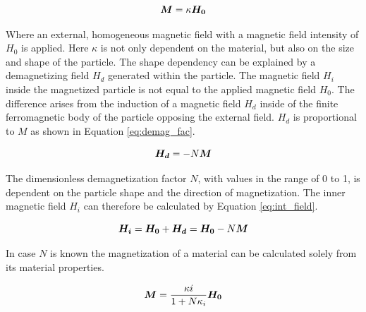 \begin{equation}
\label{eq:kappa}
\centering
\boldsymbol{M} = \kappa\boldsymbol{H_{0}}
\end{equation}

Where an external, homogeneous magnetic field with a magnetic field intensity of $H_{0}$ is applied. Here $\kappa$ is not only dependent on the material, but also on the size and shape of the particle. The shape dependency can be explained by a demagnetizing field $H_{d}$ generated within the particle. The magnetic field $H_{i}$ inside the magnetized particle is not equal to the applied magnetic field $H_{0}$. The difference arises from the induction of a magnetic field $H_{d}$ inside of the finite ferromagnetic body of the particle opposing the external field. $H_{d}$ is proportional to $M$ as shown in Equation \ref{eq:demag_fac}. 

\begin{equation}
\label{eq:demag_fac}
\centering
\boldsymbol{H_{d}} = -N\boldsymbol{M}
\end{equation}

The dimensionless demagnetization factor $N$, with values in the range of 0 to 1, is dependent on the particle shape and the direction of magnetization. The inner magnetic field $H_{i}$ can therefore be calculated by Equation \ref{eq:int_field}. 

\begin{equation}
\label{eq:int_field}
\centering
\boldsymbol{H_{i}} = \boldsymbol{H_{0}} + \boldsymbol{H_{d}} = \boldsymbol{H_{0}} - N\boldsymbol{M}
\end{equation}

In case $N$ is known the magnetization of a material can be calculated solely from its material properties. 

\begin{equation}
\label{eq:mag_demag_fac}
\centering
\boldsymbol{M} = \frac{\kappa{i}}{1+N\kappa_{i}}\boldsymbol{H_{0}}
\end{equation}


